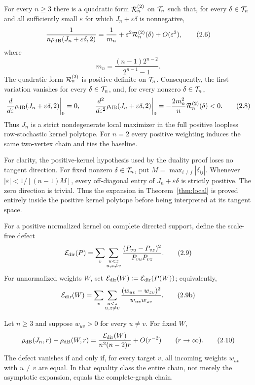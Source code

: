\begin{theorem}
\label{thm:local}
For every $n\ge3$ there is a quadratic form $\mathcal R^{(2)}_{n}$ on $\mathcal T_n$ such
that, for every $\delta\in\mathcal T_n$ and all sufficiently small
$\varepsilon$ for which $J_n+\varepsilon\delta$ is nonnegative,
\[
 \frac1{n\rho_{\mathrm{dB}}(J_n+\varepsilon\delta,2)}
 =\frac1{m_n}+\varepsilon^2\mathcal R^{(2)}_{n}(\delta)
   +O(\varepsilon^3),                                      \tag{2.6}\label{2.6}
\]
where
\[
 m_n=\frac{(n-1)2^{n-2}}{2^{n-1}-1}.                       \tag{2.7}\label{2.7}
\]
The quadratic form $\mathcal R^{(2)}_n$ is positive definite on $\mathcal T_n$.
Consequently, the first variation vanishes for every $\delta\in\mathcal T_n$,
and, for every nonzero $\delta\in\mathcal T_n$,
\[
 \left.\frac{d}{d\varepsilon}\rho_{\mathrm{dB}}
 (J_n+\varepsilon\delta,2)\right|_{0}=0,
 \qquad
 \left.\frac{d^2}{d\varepsilon^2}\rho_{\mathrm{dB}}
 (J_n+\varepsilon\delta,2)\right|_{0}
 =-\frac{2m_n^2}{n}\mathcal R^{(2)}_{n}(\delta)<0.                    \tag{2.8}\label{2.8}
\]
Thus $J_n$ is a strict nondegenerate local maximizer in the full positive
loopless row-stochastic kernel polytope.  For $n=2$ every positive weighting
induces the same two-vertex chain and ties the baseline.
\end{theorem}

For clarity, the positive-kernel hypothesis used by the duality proof loses
no tangent direction.  For fixed nonzero $\delta\in\mathcal T_n$, put
$M=\max_{i\ne j}|\delta_{ij}|$.  Whenever
$|\varepsilon|<1/[(n-1)M]$, every off-diagonal entry of
$J_n+\varepsilon\delta$ is strictly positive.  The zero direction is
trivial.  Thus the expansion in Theorem~\ref{thm:local} is proved entirely
inside the positive kernel polytope before being interpreted at its tangent
space.

For a positive normalized kernel on complete directed support, define the
scale-free defect
\[
 \mathcal E_{\rm dir}(P)=
 \sum_v\sum_{\substack{u<z\\u,z\ne v}}
 \frac{(P_{vu}-P_{vz})^2}{P_{vu}P_{vz}}.                   \tag{2.9}\label{2.9}
\]
For unnormalized weights $W$, set
$\mathcal E_{\rm dir}(W):=\mathcal E_{\rm dir}(P(W))$; equivalently,
\[
 \mathcal E_{\rm dir}(W)=
 \sum_v\sum_{\substack{u<z\\u,z\ne v}}
 \frac{(w_{uv}-w_{zv})^2}{w_{uv}w_{zv}}.                  \tag{2.9b}\label{2.9b}
\]

\begin{theorem}
\label{thm:strong-complete}
Let $n\ge3$ and suppose $w_{uv}>0$ for every $u\ne v$.  For fixed $W$,
\[
 \rho_{\mathrm{dB}}(J_n,r)-\rho_{\mathrm{dB}}(W,r)
 =\frac{\mathcal E_{\rm dir}(W)}{n^2(n-2)r}+O(r^{-2})
 \qquad(r\to\infty).                                      \tag{2.10}\label{2.10}
\]
The defect vanishes if and only if, for every target $v$, all incoming
weights $w_{uv}$ with $u\ne v$ are equal.  In that equality class the entire
chain, not merely the asymptotic expansion, equals the complete-graph chain.
\end{theorem}

